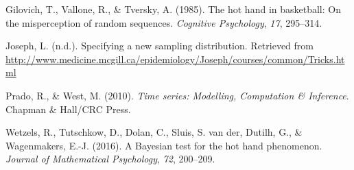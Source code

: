 \documentclass[12pt,twoside]{dukestatscithesis}
\theoremstyle{definition}
\theoremstyle{definition}
\theoremstyle{definition}
\theoremstyle{remark}
\begin{document}
\hypertarget{ref-gilovich85}{}
Gilovich, T., Vallone, R., \& Tversky, A. (1985). The hot hand in
basketball: On the misperception of random sequences. \emph{Cognitive
Psychology}, \emph{17}, 295--314.

\hypertarget{ref-joseph}{}
Joseph, L. (n.d.). Specifying a new sampling distribution. Retrieved
from
\url{http://www.medicine.mcgill.ca/epidemiology/Joseph/courses/common/Tricks.html}

\hypertarget{ref-west10}{}
Prado, R., \& West, M. (2010). \emph{Time series: Modelling, Computation
\& Inference}. Chapman \& Hall/CRC Press.

\hypertarget{ref-wetzels16}{}
Wetzels, R., Tutschkow, D., Dolan, C., Sluis, S. van der, Dutilh, G., \&
Wagenmakers, E.-J. (2016). A Bayesian test for the hot hand phenomenon.
\emph{Journal of Mathematical Psychology}, \emph{72}, 200--209.


\end{document}
